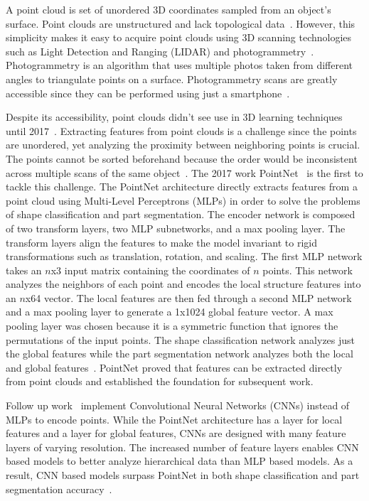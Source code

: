 A point cloud is set of unordered 3D coordinates sampled from an object's surface. Point clouds are unstructured and lack topological data~\cite{Xiao2020}. However, this simplicity makes it easy to acquire point clouds using 3D scanning technologies such as Light Detection and Ranging (LIDAR) and photogrammetry~\cite{Leberl2010}. Photogrammetry is an algorithm that uses multiple photos taken from different angles to triangulate points on a surface. Photogrammetry scans are greatly accessible since they can be performed using just a smartphone~\cite{Micheletti2015}.

Despite its accessibility, point clouds didn't see use in 3D learning techniques until 2017~\cite{Xiao2020}. Extracting features from point clouds is a challenge since the points are unordered, yet analyzing the proximity between neighboring points is crucial. The points cannot be sorted beforehand because the order would be inconsistent across multiple scans of the same object~\cite{Qi2017}. The 2017 work PointNet~\cite{Qi2017} is the first to tackle this challenge. The PointNet architecture directly extracts features from a point cloud using Multi-Level Perceptrons (MLPs) in order to solve the problems of shape classification and part segmentation. The encoder network is composed of two transform layers, two MLP subnetworks, and a max pooling layer. The transform layers align the features to make the model invariant to rigid transformations such as translation, rotation, and scaling. The first MLP network takes an $n$x3 input matrix containing the coordinates of $n$ points. This network analyzes the neighbors of each point and encodes the local structure features into an $n$x64 vector. The local features are then fed through a second MLP network and a max pooling layer to generate a 1x1024 global feature vector. A max pooling layer was chosen because it is a symmetric function that ignores the permutations of the input points. The shape classification network analyzes just the global features while the part segmentation network analyzes both the local and global features~\cite{Qi2017}. PointNet proved that features can be extracted directly from point clouds and established the foundation for subsequent work.

Follow up work~\cite{Xu2018, Li2018, Wu2019} implement Convolutional Neural Networks (CNNs) instead of MLPs to encode points. While the PointNet architecture has a layer for local features and a layer for global features, CNNs are designed with many feature layers of varying resolution. The increased number of feature layers enables CNN based models to better analyze hierarchical data than MLP based models. As a result, CNN based models surpass PointNet in both shape classification and part segmentation accuracy~\cite{Wu2019}.

